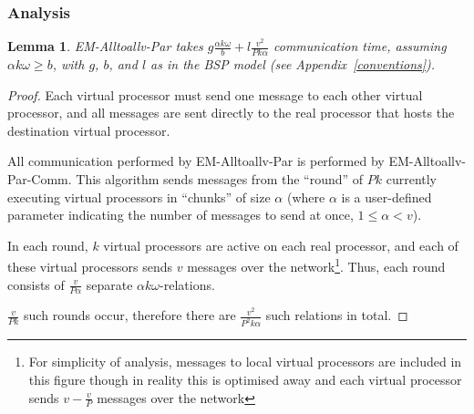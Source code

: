\documentclass[12pt]{carletoncsthesis}
\newtheorem{lemma}[thm]{Lemma}
\begin{document}
\subsubsection{Analysis}


\begin{lemma}
\label{em-alltoall-comm}
{\sc EM-Alltoallv-Par} takes $g\frac{\alpha{k}\omega}{b} + l\frac{v^2}{Pk\alpha}$
communication time, assuming $\alpha k\omega \geq b$, with $g$, $b$, and $l$ as in
the BSP model (see Appendix~\ref{conventions}).
\end{lemma}
\begin{proof}
Each virtual processor must send one message to each other virtual processor,
and all messages are sent directly to the real processor that hosts the
destination virtual processor.

All communication performed by {\sc EM-Alltoallv-Par} is performed by {\sc
EM-Alltoallv-Par-Comm}.  This algorithm sends messages from the ``round''
of $Pk$ currently executing virtual processors in ``chunks'' of size $\alpha$
(where $\alpha$ is a user-defined parameter indicating the number of messages
to send at once, $1 \leq \alpha < v$).

In each round, $k$ virtual processors are active on each real processor,
and each of these virtual processors sends $v$ messages over the
network\footnote{For simplicity of analysis, messages to local virtual
processors are included in this figure though in reality this is optimised
away and each virtual processor sends $v - \frac{v}{P}$ messages over
the network}.  Thus, each round consists of $\frac{v}{P\alpha}$ separate
$\alpha{k}\omega$-relations.

$\frac{v}{Pk}$ such rounds occur, therefore there are $\frac{v^2}{P^2k\alpha}$
such relations in total.
\end{proof}
\end{document}

